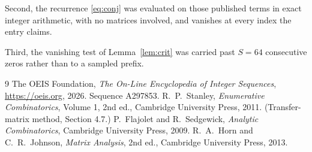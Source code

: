 \documentclass[11pt,a4paper]{article}
\theoremstyle{plain}
\theoremstyle{definition}
\begin{document}
Second, the recurrence \eqref{eq:conj} was evaluated on those published terms in exact
integer arithmetic, with no matrices involved, and vanishes at every index the entry claims.

Third, the vanishing test of Lemma~\ref{lem:crit} was carried past $S=64$ consecutive
zeros rather than to a sampled prefix.

\begin{thebibliography}{9}
 The OEIS Foundation, \emph{The On-Line Encyclopedia of Integer
Sequences}, \url{https://oeis.org}, 2026. Sequence A297853.
 R.~P.~Stanley, \emph{Enumerative Combinatorics}, Volume 1, 2nd ed.,
Cambridge University Press, 2011. (Transfer-matrix method, Section 4.7.)
 P.~Flajolet and R.~Sedgewick, \emph{Analytic Combinatorics}, Cambridge
University Press, 2009.
 R.~A.~Horn and C.~R.~Johnson, \emph{Matrix Analysis}, 2nd ed., Cambridge
University Press, 2013.
\end{thebibliography}
\end{document}
